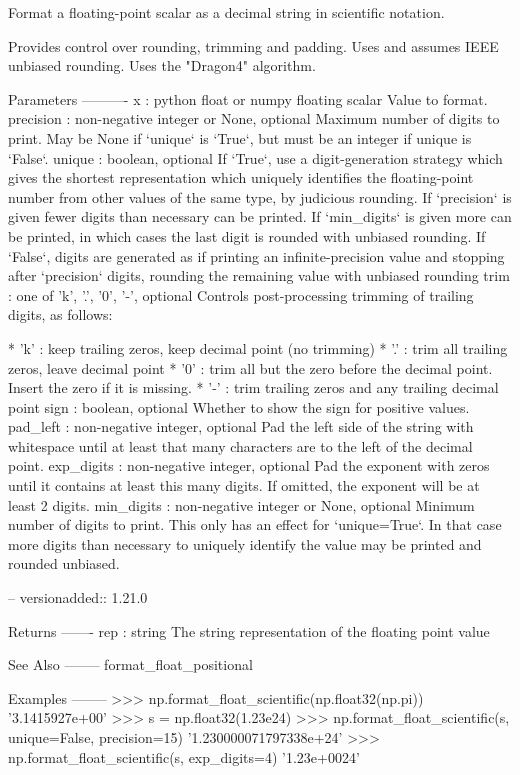\begin{DoxyVerb}Format a floating-point scalar as a decimal string in scientific notation.

Provides control over rounding, trimming and padding. Uses and assumes
IEEE unbiased rounding. Uses the "Dragon4" algorithm.

Parameters
----------
x : python float or numpy floating scalar
    Value to format.
precision : non-negative integer or None, optional
    Maximum number of digits to print. May be None if `unique` is
    `True`, but must be an integer if unique is `False`.
unique : boolean, optional
    If `True`, use a digit-generation strategy which gives the shortest
    representation which uniquely identifies the floating-point number from
    other values of the same type, by judicious rounding. If `precision`
    is given fewer digits than necessary can be printed. If `min_digits`
    is given more can be printed, in which cases the last digit is rounded
    with unbiased rounding.
    If `False`, digits are generated as if printing an infinite-precision
    value and stopping after `precision` digits, rounding the remaining
    value with unbiased rounding
trim : one of 'k', '.', '0', '-', optional
    Controls post-processing trimming of trailing digits, as follows:

    * 'k' : keep trailing zeros, keep decimal point (no trimming)
    * '.' : trim all trailing zeros, leave decimal point
    * '0' : trim all but the zero before the decimal point. Insert the
      zero if it is missing.
    * '-' : trim trailing zeros and any trailing decimal point
sign : boolean, optional
    Whether to show the sign for positive values.
pad_left : non-negative integer, optional
    Pad the left side of the string with whitespace until at least that
    many characters are to the left of the decimal point.
exp_digits : non-negative integer, optional
    Pad the exponent with zeros until it contains at least this many digits.
    If omitted, the exponent will be at least 2 digits.
min_digits : non-negative integer or None, optional
    Minimum number of digits to print. This only has an effect for
    `unique=True`. In that case more digits than necessary to uniquely
    identify the value may be printed and rounded unbiased.

    -- versionadded:: 1.21.0
    
Returns
-------
rep : string
    The string representation of the floating point value

See Also
--------
format_float_positional

Examples
--------
>>> np.format_float_scientific(np.float32(np.pi))
'3.1415927e+00'
>>> s = np.float32(1.23e24)
>>> np.format_float_scientific(s, unique=False, precision=15)
'1.230000071797338e+24'
>>> np.format_float_scientific(s, exp_digits=4)
'1.23e+0024'
\end{DoxyVerb}
 \mbox{\label{namespacenumpy_1_1core_1_1arrayprint_a65ecafa0dff7c492f6c9cc854f3e25f5}} 
